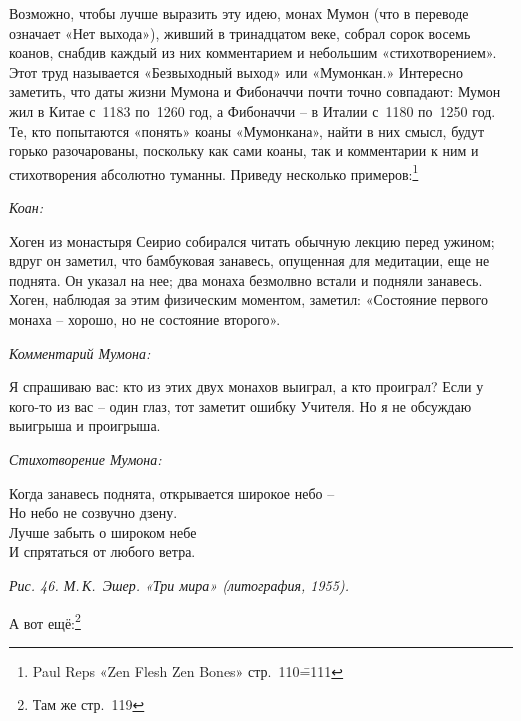 \documentclass[../main.tex]{subfiles}
\begin{document}
Возможно, чтобы лучше выразить эту идею, монах Мумон (что в переводе означает «Нет выхода»), живший в тринадцатом веке, собрал сорок восемь коанов, снабдив каждый из них комментарием и небольшим «стихотворением». Этот труд называется «Безвыходный выход» или «Мумонкан.» Интересно заметить, что даты жизни Мумона и Фибоначчи почти точно совпадают: Мумон жил в Китае с~1183 по~1260 год, а Фибоначчи \--- в Италии с~1180 по~1250 год. Те, кто попытаются «понять» коаны «Мумонкана», найти в них смысл, будут горько разочарованы, поскольку как сами коаны, так и комментарии к ним и стихотворения абсолютно туманны. Приведу несколько примеров:\footnote{Paul Reps «Zen Flesh Zen Bones» стр.~110\==111}

\begin{koan}
    \emph{\normalsize Коан:}
    \vspace{2pt}

    Хоген из монастыря Сеирио собирался читать обычную лекцию перед ужином; вдруг он заметил, что бамбуковая занавесь, опущенная для медитации, еще не поднята. Он указал на нее; два монаха безмолвно встали и подняли занавесь. Хоген, наблюдая за этим физическим моментом, заметил: «Состояние первого монаха \--- хорошо, но не состояние второго».
\end{koan}

\begin{koan}
    \emph{\normalsize Комментарий Мумона:}
    \vspace{2pt}

    Я спрашиваю вас: кто из этих двух монахов выиграл, а кто проиграл? Если у кого-то из вас \--- один глаз, тот заметит ошибку Учителя. Но я не обсуждаю выигрыша и проигрыша.
\end{koan}

\begin{koan}
    \emph{\normalsize Стихотворение Мумона:}

    \begin{mumonverse}
        Когда занавесь поднята, открывается широкое небо \--- \\
        Но небо не созвучно дзену. \\
        Лучше забыть о широком небе \\
        И спрятаться от любого ветра.
    \end{mumonverse}
\end{koan}

\emph{Рис. 46. М.\,К.~Эшер. «Три мира» (литография, 1955).}

А вот ещё:\footnote{Там же стр.~119}
\end{document}
